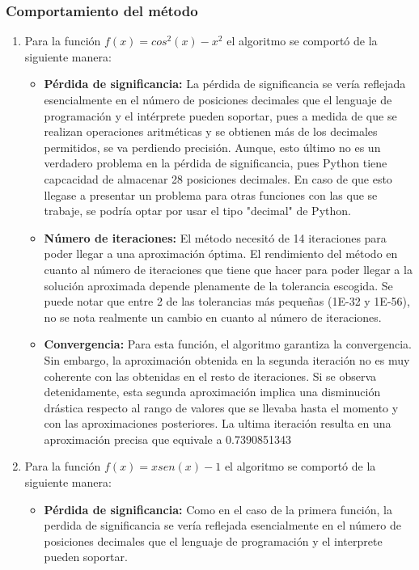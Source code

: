 \documentclass{article}
\begin{document}
\subsubsection{Comportamiento del método}
\begin{enumerate}
\item Para la función \(f(x) = cos^2(x)-x^2\) el algoritmo se comportó de la siguiente manera:
    \begin{itemize}
        \item \textbf{Pérdida de significancia:}
        La pérdida de significancia se vería reflejada esencialmente en el número de posiciones decimales que el lenguaje de programación y el intérprete pueden soportar, pues a medida de que se realizan operaciones aritméticas y se obtienen más de los decimales permitidos, se va perdiendo precisión. Aunque, esto último no es un verdadero problema en la pérdida de significancia, pues Python tiene capcacidad de almacenar 28 posiciones decimales. En caso de que esto llegase a presentar un problema para otras funciones con las que se trabaje, se podría optar por usar el tipo "decimal" de Python.
        \item \textbf{Número de iteraciones:}
        El método necesitó de 14 iteraciones para poder llegar a una aproximación óptima. El rendimiento del método en cuanto al número de iteraciones que tiene que hacer para poder llegar a la solución aproximada depende plenamente de la tolerancia escogida. Se puede notar que entre 2 de las tolerancias más pequeñas (1E-32 y 1E-56), no se nota realmente un cambio en cuanto al número de iteraciones. 
        \item \textbf{Convergencia:}
        Para esta función, el algoritmo garantiza la convergencia. Sin embargo, la aproximación obtenida en la segunda iteración no es muy coherente con las obtenidas en el resto de iteraciones. Si se observa detenidamente, esta segunda aproximación implica una disminución drástica respecto al rango de valores que se llevaba hasta el momento y con las aproximaciones posteriores. La ultima iteración resulta en una aproximación precisa que equivale a 0.7390851343
    \end{itemize}
    \item Para la función \(f(x) = xsen(x)-1\) el algoritmo se comportó de la siguiente manera:
    \begin{itemize}
        \item \textbf{Pérdida de significancia:}
        Como en el caso de la primera función, la perdida de significancia se vería reflejada esencialmente en el número de posiciones decimales que el lenguaje de programación y el interprete pueden soportar.

\end{itemize}
\end{enumerate}
\end{document}

